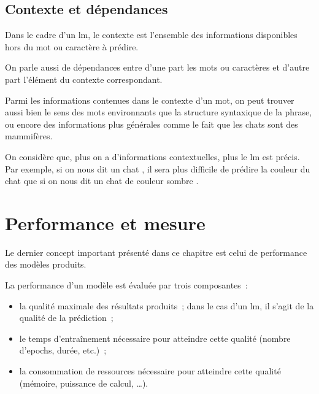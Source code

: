 \subsection{Contexte et dépendances} \label{def:context} \label{def:dependency}
Dans le cadre d'un \gls{lm}, le contexte est l'ensemble des informations disponibles hors du mot ou caractère à prédire.

On parle aussi de dépendances entre d'une part les mots ou caractères et d'autre part l'élément du contexte correspondant.

Parmi les informations contenues dans le contexte d'un mot, on peut trouver aussi bien le sens des mots environnants que la structure syntaxique de la phrase, ou encore des informations plus générales comme le fait que les chats sont des mammifères.


On considère que, plus on a d'informations contextuelles, plus le \gls{lm} est précis. Par exemple, si on nous dit \og un chat \fg{}, il sera plus difficile de prédire la couleur du chat que si on nous dit \og un chat de couleur sombre \fg{}.

\section{Performance et mesure} \label{def:bpc}
Le dernier concept important présenté dans ce chapitre est celui de performance des modèles produits.

La performance d'un modèle est évaluée par trois composantes~:
\begin{itemize}
	\item la qualité maximale des résultats produits~; dans le cas d'un \gls{lm}, il s'agit de la qualité de la prédiction~;
	\item le temps d'entraînement nécessaire pour atteindre cette qualité (nombre d'\glspl{epoch}, durée, etc.)~;
	\item la consommation de ressources nécessaire pour atteindre cette qualité (mémoire, puissance de calcul, \dots).
\end{itemize}
\vspace{1em}

